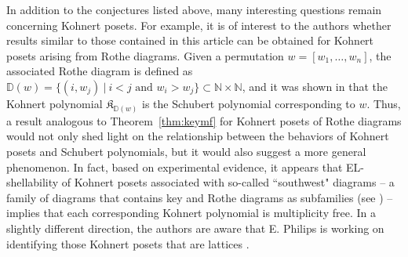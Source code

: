 \documentclass[letterpaper,10pt]{article}
\begin{document}
In addition to the conjectures listed above, many interesting questions remain concerning Kohnert posets. For example, it is of interest to the authors whether results similar to those contained in this article can be obtained for Kohnert posets arising from Rothe diagrams. Given a permutation $w=[w_1,\dots,w_n]$, the associated Rothe diagram is defined as $\mathbb{D}(w)=\{(i,w_j)~|~i<j\text{ and }w_i>w_j\}\subset\mathbb{N}\times\mathbb{N}$, and it was shown in \textbf{\cite{AssafSchu,Winkel2,Winkel1}} that the Kohnert polynomial $\mathfrak{K}_{\mathbb{D}(w)}$ is the Schubert polynomial corresponding to $w$. Thus, a result analogous to Theorem~\ref{thm:keymf} for Kohnert posets of Rothe diagrams would not only shed light on the relationship between the behaviors of Kohnert posets and Schubert polynomials, but it would also suggest a more general phenomenon. In fact, based on experimental evidence, it appears that EL-shellability of Kohnert posets associated with so-called ``southwest" diagrams -- a family of diagrams that contains key and Rothe diagrams as subfamilies (see \textbf{\cite{KP1}}) -- implies that each corresponding Kohnert polynomial is multiplicity free. In a slightly different direction, the authors are aware that E. Philips is working on identifying those Kohnert posets that are lattices \textbf{\cite{E24}}.







\printbibliography
\end{document}
